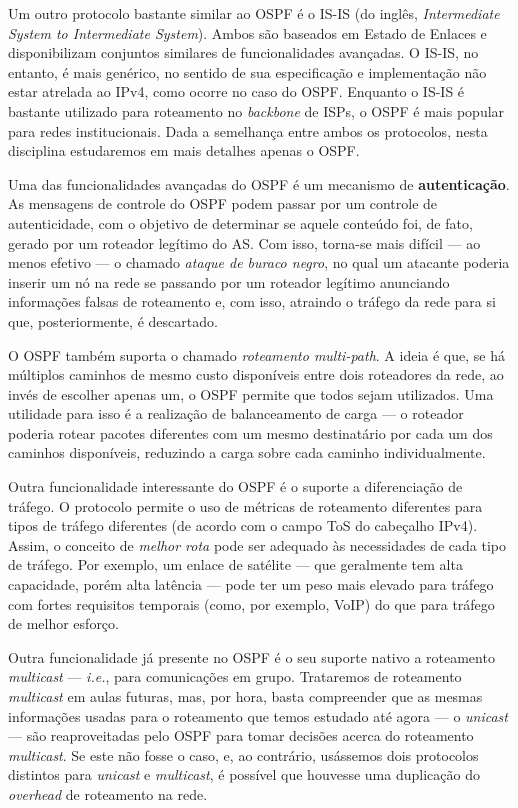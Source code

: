 \documentclass{article}
\begin{document}
Um outro protocolo bastante similar ao OSPF é o IS-IS (do inglês, \textit{Intermediate System to Intermediate System}). Ambos são baseados em Estado de Enlaces e disponibilizam conjuntos similares de funcionalidades avançadas. O IS-IS, no entanto, é mais genérico, no sentido de sua especificação e implementação não estar atrelada ao IPv4, como ocorre no caso do OSPF. Enquanto o IS-IS é bastante utilizado para roteamento no \textit{backbone} de ISPs, o OSPF é mais popular para redes institucionais. Dada a semelhança entre ambos os protocolos, nesta disciplina estudaremos em mais detalhes apenas o OSPF.

Uma das funcionalidades avançadas do OSPF é um mecanismo de \textbf{autenticação}. As mensagens de controle do OSPF podem passar por um controle de autenticidade, com o objetivo de determinar se aquele conteúdo foi, de fato, gerado por um roteador legítimo do AS. Com isso, torna-se mais difícil --- ao menos efetivo --- o chamado \textit{ataque de buraco negro}, no qual um atacante poderia inserir um nó na rede se passando por um roteador legítimo anunciando informações falsas de roteamento e, com isso, atraindo o tráfego da rede para si que, posteriormente, é descartado.

O OSPF também suporta o chamado \textit{roteamento multi-path}. A ideia é que, se há múltiplos caminhos de mesmo custo disponíveis entre dois roteadores da rede, ao invés de escolher apenas um, o OSPF permite que todos sejam utilizados. Uma utilidade para isso é a realização de balanceamento de carga --- o roteador poderia rotear pacotes diferentes com um mesmo destinatário por cada um dos caminhos disponíveis, reduzindo a carga sobre cada caminho individualmente.

Outra funcionalidade interessante do OSPF é o suporte a diferenciação de tráfego. O protocolo permite o uso de métricas de roteamento diferentes para tipos de tráfego diferentes (de acordo com o campo ToS do cabeçalho IPv4). Assim, o conceito de \textit{melhor rota} pode ser adequado às necessidades de cada tipo de tráfego. Por exemplo, um enlace de satélite --- que geralmente tem alta capacidade, porém alta latência --- pode ter um peso mais elevado para tráfego com fortes requisitos temporais (como, por exemplo, VoIP) do que para tráfego de melhor esforço.

Outra funcionalidade já presente no OSPF é o seu suporte nativo a roteamento \textit{multicast} --- \textit{i.e.}, para comunicações em grupo. Trataremos de roteamento \textit{multicast} em aulas futuras, mas, por hora, basta compreender que as mesmas informações usadas para o roteamento que temos estudado até agora --- o \textit{unicast} --- são reaproveitadas pelo OSPF para tomar decisões acerca do roteamento \textit{multicast}. Se este não fosse o caso, e, ao contrário, usássemos dois protocolos distintos para \textit{unicast} e \textit{multicast}, é possível que houvesse uma duplicação do \textit{overhead} de roteamento na rede.
\end{document}
